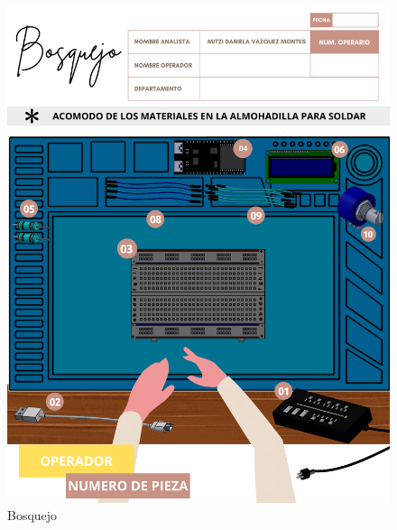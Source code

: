     \begin{figure}[H]
        \centering
        \includegraphics[trim = {1mm 1mm 1mm 1mm},clip,scale=0.2]{34/img/bosquejo.png}
        \caption{Bosquejo}
        \label{fig:enter-label2}
    \end{figure}
